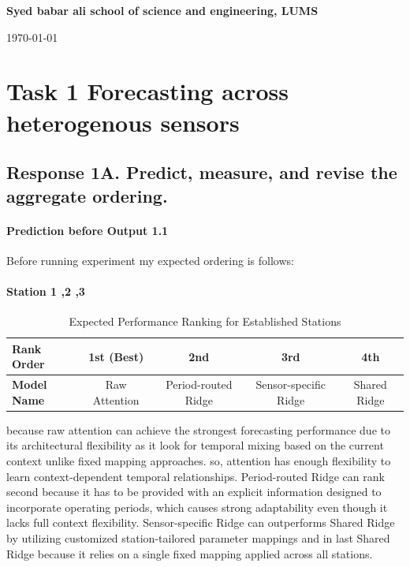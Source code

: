 \documentclass[a4, 12pt]{article}
\begin{document}
\begin{titlepage}
\vspace{2in}

\textbf{\large Syed babar ali school of science and engineering, LUMS} \\
  \vspace{14pt}

\today

\end{titlepage}

\newpage
\setcounter{page}{2}
\tableofcontents
\newpage

\section{ Task 1 Forecasting across heterogenous sensors}
\subsection{Response 1A. Predict, measure, and revise the aggregate ordering.}
\paragraph{Prediction before Output 1.1}
Before running experiment my expected ordering is follows:
\paragraph{Station 1 ,2 ,3}

\begin{table}[htbp]
\centering
\caption{Expected Performance Ranking for Established Stations}
\label{tab:established_ranking}
\vspace{2mm}
\begin{tabular}{@{} l c c c c @{}}
\toprule
\textbf{Rank Order} & \textbf{1st (Best)} & \textbf{2nd} & \textbf{3rd} & \textbf{4th} \\
\midrule
\textbf{Model Name} & Raw Attention & Period-routed Ridge & Sensor-specific Ridge & Shared Ridge \\
\bottomrule
\end{tabular}
\end{table}

because raw attention can achieve the strongest forecasting performance due to its architectural flexibility as it look for temporal mixing based on the current context unlike fixed mapping approaches. so, attention has enough flexibility to learn context-dependent temporal relationships.
Period-routed Ridge can rank second because it has to be provided with an explicit information designed to incorporate operating periods, which causes strong adaptability even though it lacks full context flexibility. 
Sensor-specific Ridge can outperforms Shared Ridge by utilizing customized station-tailored parameter mappings and in last Shared Ridge because it relies on a single fixed mapping applied across all stations.
\end{document}
